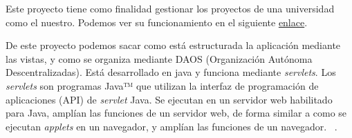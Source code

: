 Este proyecto tiene como finalidad gestionar los proyectos de una universidad como el nuestro. Podemos ver su funcionamiento en el siguiente \href{https://github.com/amujica/Gestion-TFG}{enlace}.

De este proyecto podemos sacar como está estructurada la aplicación mediante las vistas, y como se organiza mediante DAOS (Organización Autónoma Descentralizadas).
Está desarrollado en java y funciona mediante \emph{servlets}.
Los \emph{servlets} son programas Java™ que utilizan la interfaz de programación de aplicaciones (API) de \emph{servlet} Java. Se ejecutan en un servidor web habilitado para Java, amplían las funciones de un servidor web, de forma similar a como se ejecutan \emph{applets} en un navegador, y amplían las funciones de un navegador. ~\cite{servlets}.

